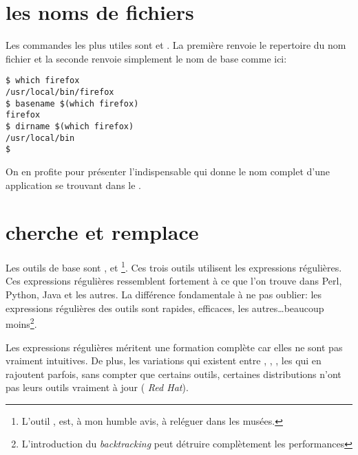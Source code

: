 
\section{les noms de fichiers}

Les commandes les plus utiles sont  et . La première renvoie le repertoire du nom fichier et la seconde renvoie simplement le nom de base comme ici:

\begin{lstlisting}
$ which firefox 
/usr/local/bin/firefox
$ basename $(which firefox)
firefox
$ dirname $(which firefox) 
/usr/local/bin
$
\end{lstlisting}

On en profite pour présenter l'indispensable  qui donne le nom complet d'une application se trouvant dans le .

\section{cherche et remplace}
Les outils de base sont ,  et \footnote{L'outil , est, à mon humble avis, à reléguer dans les musées.}. Ces trois outils utilisent les expressions régulières. Ces expressions régulières ressemblent fortement à ce que l'on trouve dans Perl, Python, Java et les autres. La différence fondamentale à ne pas oublier: les expressions régulières des outils \GNU{} sont rapides, efficaces, les autres\ldots beaucoup moins\footnote{L'introduction du \emph{backtracking} peut détruire complètement les performances}.



Les expressions régulières méritent une formation complète car elles ne sont pas vraiment intuitives. De plus, les variations qui existent entre \POSIX, \GNU, \BSD, les \shells{} qui en rajoutent parfois, sans compter que certains outils, certaines distributions n'ont pas leurs outils vraiment à jour (\cf{} \emph{Red Hat}).
